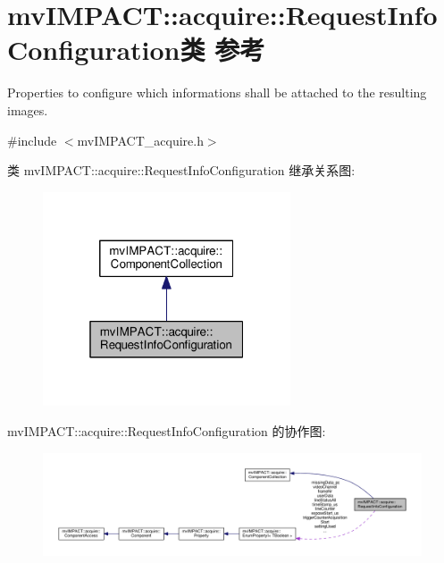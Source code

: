 \hypertarget{classmv_i_m_p_a_c_t_1_1acquire_1_1_request_info_configuration}{\section{mv\+I\+M\+P\+A\+C\+T\+:\+:acquire\+:\+:Request\+Info\+Configuration类 参考}
\label{classmv_i_m_p_a_c_t_1_1acquire_1_1_request_info_configuration}
}


Properties to configure which informations shall be attached to the resulting images.  




{\ttfamily \#include $<$mv\+I\+M\+P\+A\+C\+T\+\_\+acquire.\+h$>$}



类 mv\+I\+M\+P\+A\+C\+T\+:\+:acquire\+:\+:Request\+Info\+Configuration 继承关系图\+:
\nopagebreak
\begin{figure}[H]
\begin{center}
\leavevmode
\includegraphics[width=208pt]{classmv_i_m_p_a_c_t_1_1acquire_1_1_request_info_configuration__inherit__graph}
\end{center}
\end{figure}


mv\+I\+M\+P\+A\+C\+T\+:\+:acquire\+:\+:Request\+Info\+Configuration 的协作图\+:
\nopagebreak
\begin{figure}[H]
\begin{center}
\leavevmode
\includegraphics[width=350pt]{classmv_i_m_p_a_c_t_1_1acquire_1_1_request_info_configuration__coll__graph}
\end{center}
\end{figure}

